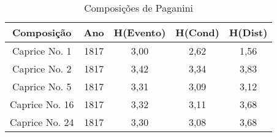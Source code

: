 \begin{table}[]
\centering
\caption{Composições de Paganini}
\begin{tabular}{|c|c|c|c|c|}
\hline
\rowcolor[HTML]{9B9B9B} 
{\color[HTML]{FFFFFF} Composição} & {\color[HTML]{FFFFFF} Ano} & {\color[HTML]{FFFFFF} H(Evento)} & {\color[HTML]{FFFFFF} H(Cond)} & {\color[HTML]{FFFFFF} H(Dist)} \\ \hline
Caprice No. 1                     & 1817                       & 3,00                             & 2,62                           & 1,56                           \\ \hline
Caprice No. 2                     & 1817                       & 3,42                             & 3,34                           & 3,83                           \\ \hline
Caprice No. 5                     & 1817                       & 3,31                             & 3,09                           & 3,12                           \\ \hline
Caprice No. 16                    & 1817                       & 3,32                             & 3,11                           & 3,68                           \\ \hline
Caprice No. 24                    & 1817                       & 3,30                             & 3,08                           & 3,68                           \\ \hline
\end{tabular}
\end{table}

